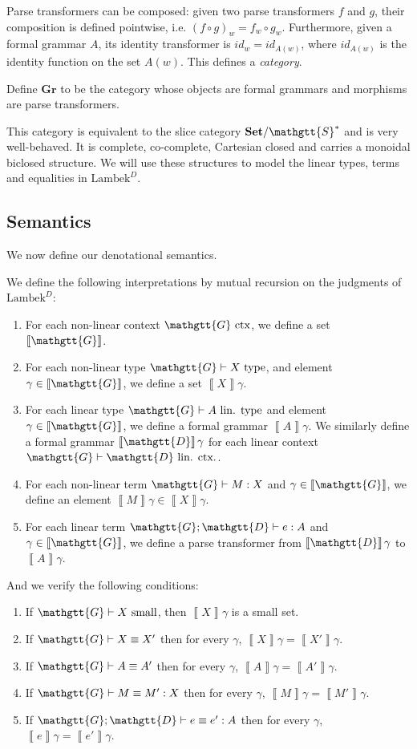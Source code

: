 \documentclass[acmsmall,nonacm]{acmart}
\renewcommand{\Gamma}{\mathgtt{G}}
\renewcommand{\Delta}{\mathgtt{D}}
\renewcommand{\Sigma}{\mathgtt{S}}
\newcommand{\sem}[1]{\left\llbracket{#1}\right\rrbracket}
\newcommand{\Set}{\mathbf{Set}}
\newcommand{\Grammar}{\mathbf{Gr}}
\newcommand{\theoryabbv}{$\textrm{Lambek}^D$\xspace}
\newcommand{\isTy}{\textrm{ type}}
\newcommand{\isCtx}{\textrm{ ctx}}
\newcommand{\isSmall}{\textrm{ small}}
\newcommand{\isLinTy}{\textrm{ lin. type}}
\newcommand{\isLinCtx}{\textrm{ lin. ctx.}}
\newcommand{\linctxwff}[2]{#1 \vdash #2 \isLinCtx}
\begin{document}
{Parse transformers can be composed: given two parse transformers $f$ and $g$,
their composition is defined pointwise, i.e. $(f\circ g)_w = f_w \circ g_w$.
Furthermore, given a formal grammar $A$, its identity transformer is $id_w =
id_{A(w)}$, where $id_{A(w)}$ is the identity function on the set $A(w)$. This
defines a \emph{category}.
\begin{definition}
  Define $\Grammar$ to be the category whose objects are formal
  grammars and morphisms are parse transformers.
\end{definition}
This category is equivalent to the slice category $\Set/\Sigma^*$ and
is very well-behaved. It is complete, co-complete, Cartesian
closed and carries a monoidal biclosed structure. We will use these
structures to model the linear types, terms and equalities in
\theoryabbv.

\subsection{Semantics}

We now define our denotational semantics.
\begin{definition}
  We define the following interpretations by mutual recursion on the
  judgments of \theoryabbv:
  \begin{enumerate}
  \item For each non-linear context $\Gamma \isCtx$, we define a set $\sem \Gamma$.
  \item For each non-linear type $\Gamma \vdash X \isTy$, and element
    $\gamma \in \sem\Gamma$, we define a set $\sem X \gamma$.
  \item For each linear type $\Gamma \vdash A \isLinTy$ and element $\gamma
    \in \sem\Gamma$, we define a formal grammar $\sem{A}\gamma$. We
    similarly define a formal grammar $\sem\Delta\gamma$ for each
    linear context $\linctxwff \Gamma \Delta$.
  \item For each non-linear term $\Gamma \vdash M : X$ and $\gamma \in \sem{\Gamma}$, we define an element $\sem{M}\gamma \in \sem{X}\gamma$.
  \item For each linear term $\Gamma; \Delta \vdash e : A$ and $\gamma \in \sem{\Gamma}$, we define a parse transformer from $\sem{\Delta}\gamma$ to $\sem{A}\gamma$.
  \end{enumerate}
  And we verify the following conditions:
  \begin{enumerate}
  \item If $\Gamma \vdash X \isSmall$, then $\sem X \gamma$ is a small set.
  \item If $\Gamma \vdash X \equiv X'$ then for every $\gamma$, $\sem{X}\gamma = \sem{X'}\gamma$.
  \item If $\Gamma \vdash A \equiv A'$ then for every $\gamma$, $\sem{A}\gamma = \sem{A'}\gamma$.
  \item If $\Gamma \vdash M \equiv M' : X$ then for every $\gamma$, $\sem{M}\gamma = \sem{M'}\gamma$.
  \item If $\Gamma;\Delta \vdash e \equiv e' : A$ then for every $\gamma$, $\sem{e}\gamma = \sem{e'}\gamma$.
  \end{enumerate}
\end{definition}

}
\end{document}
